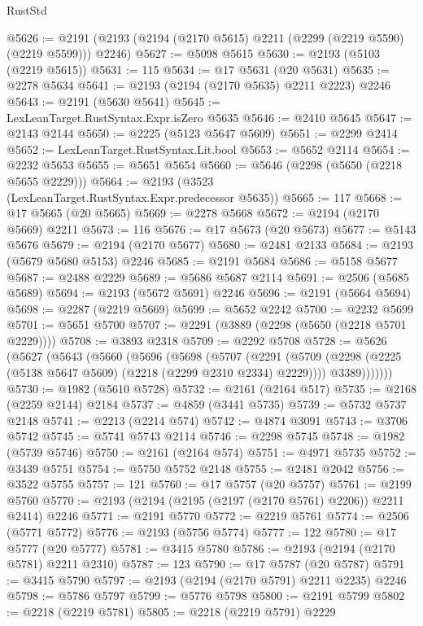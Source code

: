 \begin{lexlean}{RustStd}
\begin{coremodule}
@5626 := @2191 (@2193 (@2194 (@2170 @5615) @2211 (@2299 (@2219 @5590) (@2219 @5599))) @2246)
@5627 := @5098 @5615
@5630 := @2193 (@5103 (@2219 @5615))
@5631 := 115
@5634 := @17 @5631 (@20 @5631)
@5635 := @2278 @5634
@5641 := @2193 (@2194 (@2170 @5635) @2211 @2223) @2246
@5643 := @2191 (@5630 @5641)
@5645 := LexLeanTarget.RustSyntax.Expr.isZero @5635
@5646 := @2410 @5645
@5647 := @2143 @2144
@5650 := @2225 (@5123 @5647 @5609)
@5651 := @2299 @2414
@5652 := LexLeanTarget.RustSyntax.Lit.bool
@5653 := @5652 @2114
@5654 := @2232 @5653
@5655 := @5651 @5654
@5660 := @5646 (@2298 (@5650 (@2218 @5655 @2229)))
@5664 := @2193 (@3523 (LexLeanTarget.RustSyntax.Expr.predecessor @5635))
@5665 := 117
@5668 := @17 @5665 (@20 @5665)
@5669 := @2278 @5668
@5672 := @2194 (@2170 @5669) @2211
@5673 := 116
@5676 := @17 @5673 (@20 @5673)
@5677 := @5143 @5676
@5679 := @2194 (@2170 @5677)
@5680 := @2481 @2133
@5684 := @2193 (@5679 @5680 @5153) @2246
@5685 := @2191 @5684
@5686 := @5158 @5677
@5687 := @2488 @2229
@5689 := @5686 @5687 @2114
@5691 := @2506 (@5685 @5689)
@5694 := @2193 (@5672 @5691) @2246
@5696 := @2191 (@5664 @5694)
@5698 := @2287 (@2219 @5669)
@5699 := @5652 @2242
@5700 := @2232 @5699
@5701 := @5651 @5700
@5707 := @2291 (@3889 (@2298 (@5650 (@2218 @5701 @2229))))
@5708 := @3893 @2318
@5709 := @2292 @5708
@5728 := @5626
    (@5627
      (@5643
        (@5660
          (@5696
            (@5698
              (@5707
                (@2291
                  (@5709 (@2298 (@2225 (@5138 @5647 @5609) (@2218 (@2299 @2310 @2334) @2229))))
                  @3389)))))))
@5730 := @1982 (@5610 @5728)
@5732 := @2161 (@2164 @517)
@5735 := @2168 (@2259 @2144) @2184
@5737 := @4859 (@3441 @5735)
@5739 := @5732 @5737 @2148
@5741 := @2213 (@2214 @574)
@5742 := @4874 @3091
@5743 := @3706 @5742
@5745 := @5741 @5743 @2114
@5746 := @2298 @5745
@5748 := @1982 (@5739 @5746)
@5750 := @2161 (@2164 @574)
@5751 := @4971 @5735
@5752 := @3439 @5751
@5754 := @5750 @5752 @2148
@5755 := @2481 @2042
@5756 := @3522 @5755
@5757 := 121
@5760 := @17 @5757 (@20 @5757)
@5761 := @2199 @5760
@5770 := @2193 (@2194 (@2195 (@2197 (@2170 @5761) @2206)) @2211 @2414) @2246
@5771 := @2191 @5770
@5772 := @2219 @5761
@5774 := @2506 (@5771 @5772)
@5776 := @2193 (@5756 @5774)
@5777 := 122
@5780 := @17 @5777 (@20 @5777)
@5781 := @3415 @5780
@5786 := @2193 (@2194 (@2170 @5781) @2211 @2310)
@5787 := 123
@5790 := @17 @5787 (@20 @5787)
@5791 := @3415 @5790
@5797 := @2193 (@2194 (@2170 @5791) @2211 @2235) @2246
@5798 := @5786 @5797
@5799 := @5776 @5798
@5800 := @2191 @5799
@5802 := @2218 (@2219 @5781)
@5805 := @2218 (@2219 @5791) @2229

\end{coremodule}
\end{lexlean}
